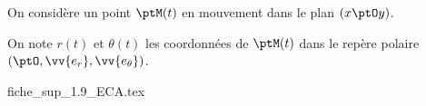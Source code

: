 

\finEntrainement






\hauteurLargeurCadreReponse		{8mm}{5cm}
\initialisationEntrainement



\initialisationPartieGauche %
On considère un point $\ptM(t)$ en mouvement dans le plan $(x \ptO y)$. 

On note $r(t)$ et $\theta(t)$ les coordonnées de $\ptM(t)$ 
dans le repère polaire $(\ptO, \vv{e_r}, \vv{e_\theta})$.
\initialisationPartieDroite %
\begin{center}
	{fiche_sup_1.9_ECA.tex}
\end{center}
\finalisationDuPartageDePage %


